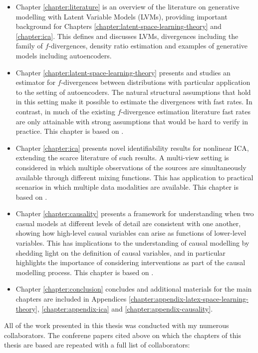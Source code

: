 \begin{itemize}
\item Chapter \ref{chapter:literature} is an overview of the literature on generative modelling with Latent Variable Models (LVMs), providing important background for Chapters \ref{chapter:latent-space-learning-theory} and \ref{chapter:ica}. 
This defines and discusses LVMs, divergences including the family of $f$-divergences, density ratio estimation and examples of generative models including autoencoders.
\item Chapter \ref{chapter:latent-space-learning-theory} presents and studies an estimator for $f$-divergences between distributions with particular application to the setting of autoencoders. 
The natural structural assumptions that hold in this setting make it possible to estimate the divergences with fast rates.
In contrast, in much of the existing $f$-divergence estimation literature fast rates are only attainable with strong assumptions that would be hard to verify in practice.
This chapter is based on \cite{rubenstein2019practical}.
\item Chapter \ref{chapter:ica} presents novel identifiability results for nonlinear ICA, extending the scarce literature of such results. 
A multi-view setting is considered in which multiple observations of the sources are simultaneously available through different mixing functions.
This has application to practical scenarios in which multiple data modalities are available.
This chapter is based on \cite{gresele2019incomplete}.
\item Chapter \ref{chapter:causality} presents a framework for understanding when two casual models at different levels of detail are consistent with one another, showing how high-level causal variables can arise as functions of lower-level variables.
This has implications to the understanding of causal modelling by shedding light on the definition of causal variables, and in particular highlights the importance of considering interventions as part of the causal modelling process.
This chapter is based on \cite{rubenstein2017causal}.
\item Chapter \ref{chapter:conclusion} concludes and additional materials for the main chapters are included in Appendices \ref{chapter:appendix-latex-space-learning-theory}, \ref{chapter:appendix-ica} and \ref{chapter:appendix-causality}.
\end{itemize}

\medskip

All of the work presented in this thesis was conducted with my numerous collaborators. 
The conferene papers cited above on which the chapters of this thesis are based are repeated with a full list of collaborators:

